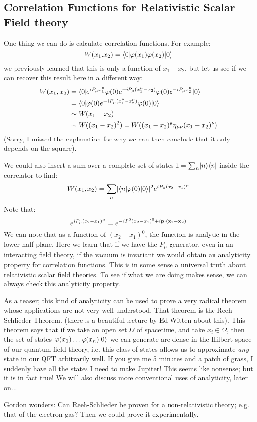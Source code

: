 \subsection{Correlation Functions for Relativistic Scalar Field theory}
One thing we can do is calculate correlation functions. For example:
\begin{equation}
    W(x_1. x_2) = \bra{0}\varphi(x_1)\varphi(x_2)\ket{0}
\end{equation}
we previously learned that this is only a function of $x_1 - x_2$, but let us see if we can recover this result here in a different way:
\begin{equation}
    \begin{split}
        W(x_1, x_2) &= \bra{0}e^{iP_\mu x_1^\mu} \varphi(0)e^{-iP_\mu (x_1^\mu - x_2)} \varphi(0)e^{-iP_\mu x_2^\mu}\ket{0}
    \\ &= \bra{0} \varphi(0)e^{-iP_\mu (x_1^\mu - x_2^\mu)} \varphi(0)\ket{0}
    \\ &\sim W(x_1 - x_2)
    \\ &\sim W((x_1 - x_2)^2) = W((x_1 - x_2)^\mu \eta_{\mu\nu}(x_1 - x_2)^\nu)
    \end{split}
\end{equation}
(Sorry, I missed the explanation for why we can then conclude that it only depends on the square).

We could also insert a sum over a complete set of states $\mathbb{I} = \sum_n \lvert n \rangle \langle n \rvert$ inside the correlator to find:
\begin{equation}
    W(x_1, x_2) = \sum_n \abs{\bra{n}\varphi(0)\ket{0}}^2 e^{iP_\mu (x_2 - x_1)^\mu}
\end{equation}
Note that:
\begin{equation}
    e^{iP_\mu (x_2 - x_1)^\mu} = e^{-iP^0(x_2 - x_1)^0 + i\mathbf{p} \cdot (\mathbf{x}_1 - \mathbf{x}_2)}
\end{equation}
We can note that as a function of $(x_2 - x_1)^0$, the function is analytic in the lower half plane. Here we learn that if we have the $P_\mu$ generator, even in an interacting field theory, if the vacuum is invariant we would obtain an analyticity property for correlation functions. This is in some sense a universal truth about relativistic scalar field theories. To see if what we are doing makes sense, we can always check this analyticity property.

As a teaser; this kind of analyticity can be used to prove a very radical theorem whose applications are not very well understood. That theorem is the Reeh-Schlieder Theorem. (there is a beautiful lecture by Ed Witten about this). This theorem says that if we take an open set $\Omega$ of spacetime, and take $x_i \in \Omega$, then the set of states $\varphi(x_1)\ldots \varphi(x_n)\ket{0}$ we can generate are dense in the Hilbert space of our quantum field theory, i.e. this class of states allows us to approximate \emph{any} state in our QFT arbitrarily well. If you give me 5 minutes and a patch of grass, I suddenly have all the states I need to make Jupiter! This seems like nonsense; but it is in fact true! We will also discuss more conventional uses of analyticity, later on...

Gordon wonders: Can Reeh-Schlieder be proven for a non-relativistic theory; e.g. that of the electron gas? Then we could prove it experimentally.